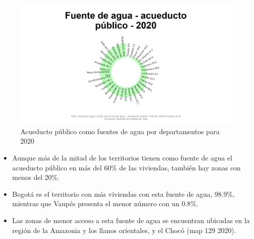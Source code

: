     \begin{figure}[H]
        \caption{Acueducto público como fuentes de agua por departamentos para 2020 \label{map_result_2} }
        \begin{center}
        \includegraphics[width=\textwidth,keepaspectratio]{img/var_129_static.png}
        \end{center}
    \end{figure}
            \begin{itemize}
                    \item Aunque más de la mitad de los territorios tienen como fuente de agua el acueducto público en más del 60\% de las viviendas, también hay zonas con menos del 20\%.
                    \item Bogotá es el territorio con más viviendas con esta fuente de agua, 98.9\%, mientras que Vaupés presenta el menor número con un 0.8\%.
                    \item Las zonas de menor acceso a esta fuente de agua se encuentran ubicadas en la región de la Amazonia y los llanos orientales, y el Chocó (map 129 2020).
                    \end{itemize}

